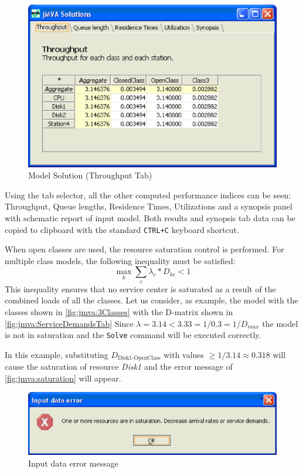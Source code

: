 \begin{figure}[htbp]
    \begin{center}
        \includegraphics[scale=.5]{img/jmva/results}
    \end{center}
    \caption{Model Solution (Throughput Tab)}
    \label{fig:jmva:results}
\end{figure}

Using the tab selector, all the other computed performance indices
can be seen: Throughput, Queue lengths, Residence Times,
Utilizations and a synopsis panel with schematic report of input
model. Both results and synopsis tab data can be copied to clipboard
with the standard \texttt{CTRL+C} keyboard shortcut.

When open classes are used, the resource saturation control is
performed. For multiple class models, the following inequality must
be satisfied:
\[
{\max_k {\sum_c{\lambda_c * D_{kc}}}} < 1
\]
This inequality ensures that no service center is saturated as a
result of the combined loads of all the classes. Let us consider, as
example, the model with the classes shown in
\autoref{fig:jmva:3Classes} with the D-matrix shown in
\autoref{fig:jmva:ServiceDemandsTab} Since $\lambda = 3.14 < 3.33 =
1 / 0.3 = 1 / D_{max}$ the model is not in saturation and the
\texttt{Solve} command will be executed correctly.

In this example, substituting $D_{\textrm{Disk1-OpenClass}}$ with
values $\geq 1/3.14 \approx 0.318$ will cause the saturation of
resource \emph{Disk1} and the error message of
\autoref{fig:jmva:saturation} will appear.

\begin{figure}[htbp]
    \begin{center}
        \includegraphics[scale=.5]{img/jmva/saturation}
    \end{center}
    \caption{Input data error message }
    \label{fig:jmva:saturation}
\end{figure}

